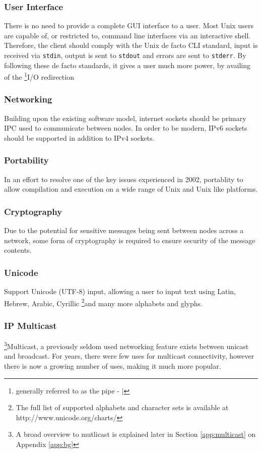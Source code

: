
\subsubsection{User Interface}

There is no need to provide a complete GUI interface to a user. Most
Unix users are capable of, or restricted to, command line interfaces via
an interactive shell. Therefore, the client should comply with the 
Unix de facto CLI standard, input is received via \verb!stdin!, output
is sent to \verb!stdout! and errors are sent to \verb!stderr!. By
following these de facto standards, it gives a user much more power, by
availing of the 
\footnote{generally referred to as the pipe - $\mid$}{I/O redirection}

\subsubsection{Networking}

Building upon the existing software model, internet sockets should be 
primary IPC used to communicate between nodes. In order to be modern,
IPv6 sockets should be supported in addition to IPv4 sockets.

\subsubsection{Portability}

In an effort to resolve one of the key issues experienced in 2002, 
portablity to allow compilation and execution on a wide range of Unix
and Unix like platforms.

\subsubsection{Cryptography}

Due to the potential for sensitive messages being sent between nodes
across a network, some form of cryptography is required to ensure 
security of the message contents.

\subsubsection{Unicode}

Support Unicode (UTF-8) input, allowing a user to input text using 
Latin, Hebrew, Arabic, Cyrillic
\footnote{The full list of supported alphabets and character sets is available at http://www.unicode.org/charts/}{and many more}
alphabets and glyphs. 

\subsubsection{IP Multicast}

\footnote{A broad overview to mutlicast is explained later in Section \ref{app:multicast} on Appendix \ref{app:bg}}{Multicast}, 
a previously seldom used networking feature exists between unicast and 
broadcast. For years, there were few uses for multicast connectivity, 
however there is now a growing number of uses, making it much more 
popular. 

